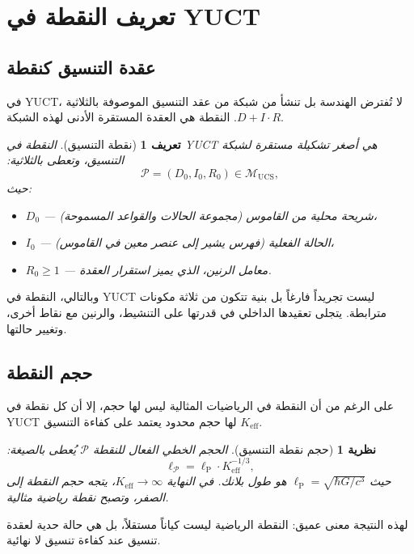 \documentclass[12pt,a4paper]{article}
\newtheorem{theorem}{نظرية}
\newtheorem{definition}{تعريف}
\newcommand{\Keff}{K_{\mathrm{eff}}}
\newcommand{\calP}{\mathcal{P}}
\newcommand{\ellP}{\ell_{\mathrm{P}}}
\begin{document}
	\section{تعريف النقطة في YUCT}
	
	\subsection{عقدة التنسيق كنقطة}
	
	في YUCT، لا تُفترض الهندسة بل تنشأ من شبكة من عقد التنسيق الموصوفة بالثلاثية \(D+I\cdot R\). النقطة هي العقدة المستقرة الأدنى لهذه الشبكة.
	
	\begin{definition}[نقطة التنسيق]
		النقطة في YUCT هي أصغر تشكيلة مستقرة لشبكة التنسيق، وتعطى بالثلاثية:
		\[
		\calP = (D_0, I_0, R_0) \in \mathcal{M}_{\mathrm{UCS}},
		\]
		حيث:
		\begin{itemize}
			\item \(D_0\) — شريحة محلية من القاموس (مجموعة الحالات والقواعد المسموحة)،
			\item \(I_0\) — الحالة الفعلية (فهرس يشير إلى عنصر معين في القاموس)،
			\item \(R_0 \ge 1\) — معامل الرنين، الذي يميز استقرار العقدة.
		\end{itemize}
	\end{definition}
	
	وبالتالي، النقطة في YUCT ليست تجريداً فارغاً بل بنية تتكون من ثلاثة مكونات مترابطة. يتجلى تعقيدها الداخلي في قدرتها على التنشيط، والرنين مع نقاط أخرى، وتغيير حالتها.
	
	\subsection{حجم النقطة}
	
	على الرغم من أن النقطة في الرياضيات المثالية ليس لها حجم، إلا أن كل نقطة في YUCT لها حجم محدود يعتمد على كفاءة التنسيق \(\Keff\).
	
	\begin{theorem}[حجم نقطة التنسيق]
		الحجم الخطي الفعال للنقطة \(\calP\) يُعطى بالصيغة:
		\[
		\ell_{\calP} = \ellP \cdot \Keff^{-1/3},
		\]
		حيث \(\ellP = \sqrt{\hbar G / c^3}\) هو طول بلانك.
		في النهاية \(\Keff \to \infty\)، يتجه حجم النقطة إلى الصفر، وتصبح نقطة رياضية مثالية.
	\end{theorem}
	
	لهذه النتيجة معنى عميق: النقطة الرياضية ليست كياناً مستقلاً، بل هي حالة حدية لعقدة تنسيق عند كفاءة تنسيق لا نهائية.
	
\end{document}
